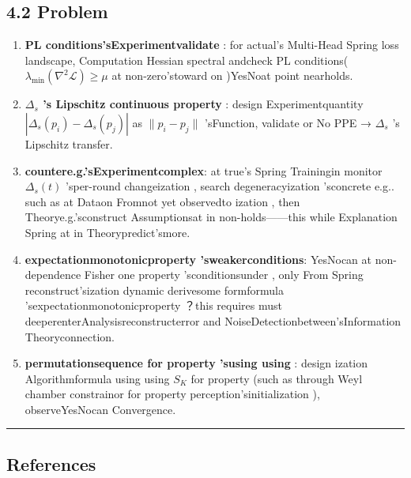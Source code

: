 \documentclass[
  12pt,
]{article}
\begin{document}
\subsection{4.2 Problem}\label{ux5f00ux653eux95eeux9898}

\begin{enumerate}
\def\labelenumi{\arabic{enumi}.}
\item
  \textbf{PL conditions'sExperimentvalidate }: for actual's Multi-Head Spring loss landscape, Computation
  Hessian spectral andcheck PL
  conditions(\(\lambda_{\min}(\nabla^2\mathcal{L}) \geq \mu\)
  at non-zero'stoward on )YesNoat point nearholds. 
\item
  \textbf{\(\Delta_s\) 's Lipschitz continuous property }: design Experimentquantity 
  \(|\Delta_s(p_i) - \Delta_s(p_j)|\) as  \(\|p_i - p_j\|\)
  'sFunction, validate or No PPE → \(\Delta_s\) 's Lipschitz transfer. 
\item
  \textbf{countere.g.'sExperimentcomplex}: at true's Spring Trainingin monitor \(\Delta_s(t)\)
  'sper-round changeization , search degeneracyization 'sconcrete e.g.. such as at Dataon Fromnot yet observedto ization , then Theorye.g.'sconstruct Assumptionsat in non-holds------this while Explanation
  Spring at in Theorypredict'smore. 
\item
  \textbf{expectationmonotonicproperty 'sweakerconditions}: YesNocan at non-dependence Fisher
  one property 'sconditionsunder , only From Spring
  reconstruct'sization dynamic derivesome formformula 'sexpectationmonotonicproperty ？this requires must deeperenterAnalysisreconstructerror and NoiseDetectionbetween'sInformation Theoryconnection. 
\item
  \textbf{permutationsequence for property 'susing using }: design ization Algorithmformula using using  \(S_K\)
  for property (such as through  Weyl chamber
  constrainor for property perception'sinitialization ), observeYesNocan Convergence. 
\end{enumerate}

\begin{center}\rule{0.5\linewidth}{0.5pt}\end{center}

\subsection{References}\label{ux53c2ux8003ux6587ux732e}
\end{document}
